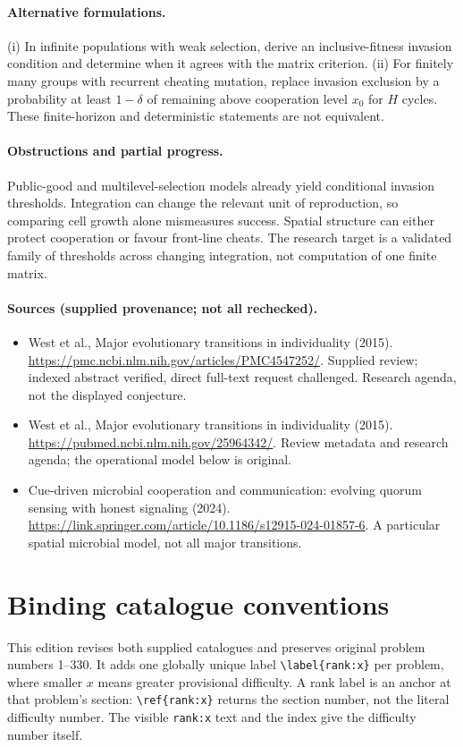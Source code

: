 \documentclass[11pt]{article}
\begin{document}
\paragraph{Alternative formulations.} (i) In infinite populations with weak selection, derive an inclusive-fitness invasion condition and determine when it agrees with the matrix criterion. (ii) For finitely many groups with recurrent cheating mutation, replace invasion exclusion by a probability at least $1-\delta$ of remaining above cooperation level $x_0$ for $H$ cycles. These finite-horizon and deterministic statements are not equivalent.
\paragraph{Obstructions and partial progress.} Public-good and multilevel-selection models already yield conditional invasion thresholds. Integration can change the relevant unit of reproduction, so comparing cell growth alone mismeasures success. Spatial structure can either protect cooperation or favour front-line cheats. The research target is a validated family of thresholds across changing integration, not computation of one finite matrix.
\paragraph{Sources (supplied provenance; not all rechecked).}
\begin{itemize}
\item West et al., Major evolutionary transitions in individuality (2015). \url{https://pmc.ncbi.nlm.nih.gov/articles/PMC4547252/}. Supplied review; indexed abstract verified, direct full-text request challenged. Research agenda, not the displayed conjecture.
\item West et al., Major evolutionary transitions in individuality (2015). \url{https://pubmed.ncbi.nlm.nih.gov/25964342/}. Review metadata and research agenda; the operational model below is original.
\item Cue-driven microbial cooperation and communication: evolving quorum sensing with honest signaling (2024). \url{https://link.springer.com/article/10.1186/s12915-024-01857-6}. A particular spatial microbial model, not all major transitions.
\end{itemize}


\section*{Binding catalogue conventions}
This edition revises both supplied catalogues and preserves original problem numbers 1--330. It adds one globally unique label \verb|\label{rank:x}| per problem, where smaller $x$ means greater provisional difficulty. A rank label is an anchor at that problem's section: \verb|\ref{rank:x}| returns the section number, not the literal difficulty number. The visible \texttt{rank:x} text and the index give the difficulty number itself.
\end{document}
